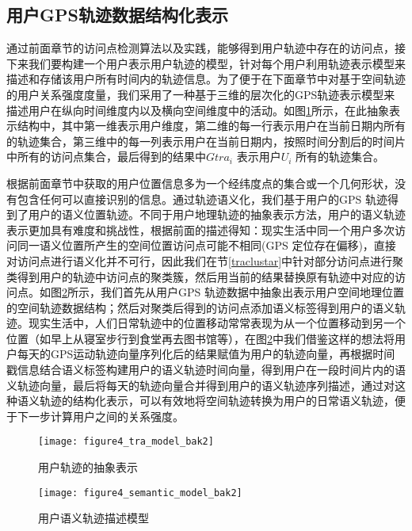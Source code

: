 \subsection{用户GPS轨迹数据结构化表示}
\label{sec:section3-4}
通过前面章节的访问点检测算法以及实践，能够得到用户轨迹中存在的访问点，接下来我们要构建一个用户表示用户轨迹的模型，针对每个用户利用轨迹表示模型来描述和存储该用户所有时间内的轨迹信息。为了便于在下面章节中对基于空间轨迹的用户关系强度度量，我们采用了一种基于三维的层次化的GPS轨迹表示模型来描述用户在纵向时间维度内以及横向空间维度中的活动。如图\ref{fig:tramodel_abstract}所示，在此抽象表示结构中，其中第一维表示用户维度，第二维的每一行表示用户在当前日期内所有的轨迹集合，第三维中的每一列表示用户在当前日期内，按照时间分割后的时间片中所有的访问点集合，最后得到的结果中$Gtra_{i}$ 表示用户$U_{i}$ 所有的轨迹集合。
\par 根据前面章节中获取的用户位置信息多为一个经纬度点的集合或一个几何形状，没有包含任何可以直接识别的信息。通过轨迹语义化，我们基于用户的GPS 轨迹得到了用户的语义位置轨迹。不同于用户地理轨迹的抽象表示方法，用户的语义轨迹表示更加具有难度和挑战性，根据前面的描述得知：现实生活中同一个用户多次访问同一语义位置所产生的空间位置访问点可能不相同(GPS 定位存在偏移)，直接对访问点进行语义化并不可行，因此我们在节\ref{traclustar}中针对部分访问点进行聚类得到用户的轨迹中访问点的聚类簇，然后用当前的结果替换原有轨迹中对应的访问点。如图\ref{fig:semantic_model}所示，我们首先从用户GPS 轨迹数据中抽象出表示用户空间地理位置的空间轨迹数据结构；然后对聚类后得到的访问点添加语义标签得到用户的语义轨迹。现实生活中，人们日常轨迹中的位置移动常常表现为从一个位置移动到另一个位置（如早上从寝室步行到食堂再去图书馆等），在图\ref{fig:semantic_model}中我们借鉴这样的想法将用户每天的GPS运动轨迹向量序列化后的结果赋值为用户的轨迹向量，再根据时间戳信息结合语义标签构建用户的语义轨迹时间向量，得到用户在一段时间片内的语义轨迹向量，最后将每天的轨迹向量合并得到用户的语义轨迹序列描述，通过对这种语义轨迹的结构化表示，可以有效地将空间轨迹转换为用户的日常语义轨迹，便于下一步计算用户之间的关系强度。
\begin{figure}[htp]
\centering
\texttt{[image: figure4\_tra\_model\_bak2]}
\caption{用户轨迹的抽象表示}
\label{fig:tramodel_abstract}
\end{figure}
\begin{figure}[htp]
\centering
\texttt{[image: figure4\_semantic\_model\_bak2]}
\caption{用户语义轨迹描述模型}
\label{fig:semantic_model}
\end{figure}
